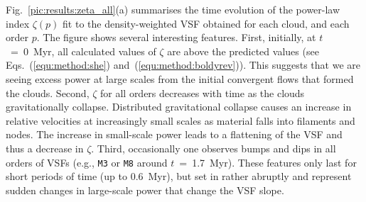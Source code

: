 \documentclass{aa}		%
\begin{document}
Fig.~\ref{pic:results:zeta_all}(a) summarises the time evolution of the power-law index $\zeta(p)$ fit to the density-weighted VSF obtained for each cloud, and each order $p$.
The figure shows several interesting features.
First, initially, at $t$~=~0~Myr, all calculated values of $\zeta$ are above the predicted values (see Eqs.~(\ref{equ:method:she}) and~(\ref{equ:method:boldyrev})).
This suggests that we are seeing excess power at large scales from the initial convergent flows that formed the clouds.
Second, $\zeta$ for all orders decreases with time as the clouds gravitationally collapse.
Distributed gravitational collapse causes an increase in relative velocities at increasingly small scales as material falls into filaments and nodes.  The increase in small-scale power leads to a flattening of the VSF and thus a decrease in $\zeta$.
Third, occasionally one observes bumps and dips in all orders of VSFs (e.g., \texttt{M3} or \texttt{M8} around $t$~=~1.7~Myr). 
These features only last for short periods of time (up to 0.6~Myr), but set in rather abruptly and represent sudden changes in large-scale power that change the VSF slope. 
\end{document}
